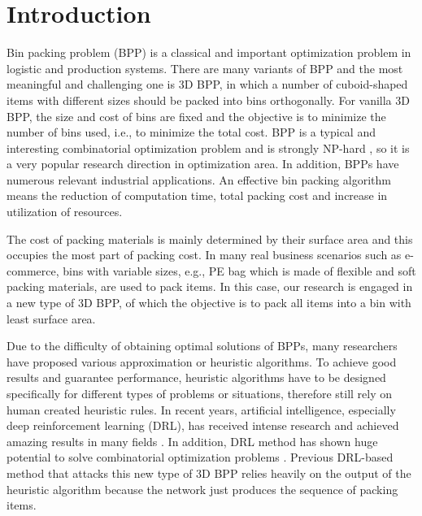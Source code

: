 \section{Introduction}
\label{sec:intro}

%
Bin packing problem (BPP) is a classical and important optimization problem in logistic and production systems. There are many variants of BPP and the most meaningful and challenging one is 3D BPP, in which a number of cuboid-shaped items with different sizes should be packed into bins orthogonally. For vanilla 3D BPP, the size and cost of bins are fixed and the objective is to minimize the number of bins used, i.e., to minimize the total cost. BPP is a typical and interesting combinatorial optimization problem and is strongly NP-hard \cite{coffman1980performance}, so it is a very popular research direction in optimization area. In addition, BPPs have numerous relevant industrial applications. An effective bin packing algorithm means the reduction of computation time, total packing cost and increase in utilization of resources.

The cost of packing materials is mainly determined by their surface area and this occupies the most part of packing cost. In many real business scenarios such as e-commerce, bins with variable sizes, e.g., PE bag which is made of flexible and soft packing materials, are used to pack items. In this case, our research is engaged in a new type of 3D BPP, of which the objective is to pack all items into a bin with least surface area. 

Due to the difficulty of obtaining optimal solutions of BPPs, many researchers have proposed various approximation or heuristic algorithms. To achieve good results and guarantee performance, heuristic algorithms have to be designed specifically for different types of problems or situations, therefore still rely on human created heuristic rules. In recent years, artificial intelligence, especially deep reinforcement learning (DRL), has received intense research and achieved amazing results in many fields \cite{mnih2013playing, silver2016mastering}. In addition, DRL method has shown huge potential to solve combinatorial optimization problems \cite{vinyals2015pointer,bello2016neural}. Previous
DRL-based method that attacks this new type of 3D BPP \cite{Hu2017Solving}
relies heavily on the output of the heuristic algorithm because the network just 
produces the sequence of packing items. 

